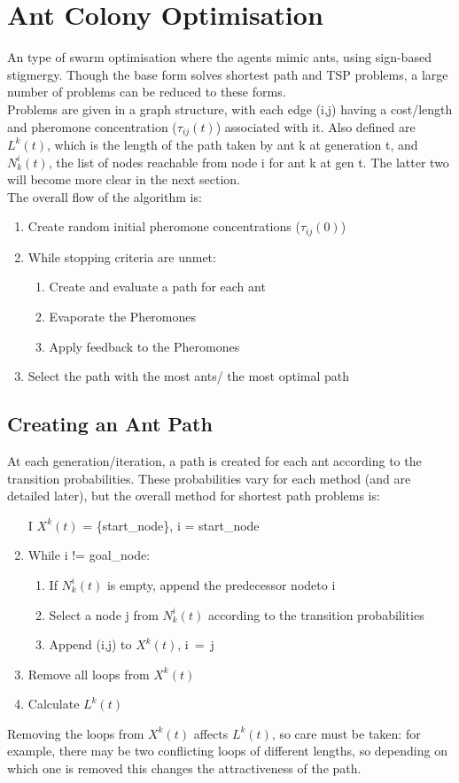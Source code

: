 \section{Ant Colony Optimisation}
An type of swarm optimisation where the agents mimic ants, using sign-based stigmergy. Though the base form solves shortest path and TSP problems, a large number of problems can be reduced to these forms.\\
Problems are given in a graph structure, with each edge (i,j) having a cost/length and pheromone concentration ($\tau_{ij}(t)$) associated with it. Also defined are $L^k(t)$, which is the length of the path taken by ant k at generation t, and $N^i_k(t)$, the list of nodes reachable from node i for ant k at gen t. The latter two will become more clear in the next section. \\
The overall flow of the algorithm is: 
\begin{enumerate}[label=\Alph*]
\item Create random initial pheromone concentrations ($\tau_{ij}(0)$)
\item While stopping criteria are unmet:
\begin{enumerate}[label=\arabic*]
    \item Create and evaluate a path for each ant 
    \item Evaporate the Pheromones
    \item Apply feedback to the Pheromones 
\end{enumerate}
\item Select the path with the most ants/ the most optimal path\\
\end{enumerate}

\subsection{Creating an Ant Path}
At each generation/iteration, a path is created for each ant according to the transition probabilities. These probabilities vary for each method (and are detailed later), but the overall method for shortest path problems is:\\
\begin{enumerate}
    \item [I] $X^k(t)$ = \{start\_node\}, i = start\_node
    \item While i != goal\_node:
    \begin{enumerate}
        \item If $N^i_k(t)$ is empty, append the predecessor nodeto i
        \item Select a node j from $N^i_k(t)$ according to the transition probabilities
        \item Append (i,j) to $X^k(t)$, i \,=  \,j
    \end{enumerate}
    \item Remove all loops from $X^k(t)$
    \item Calculate $L^k(t)$
\end{enumerate}
Removing the loops from $X^k(t)$ affects $L^k(t)$, so care must be taken: for example, there may be two conflicting loops of different lengths, so depending on which one is removed this changes the attractiveness of the path. 

